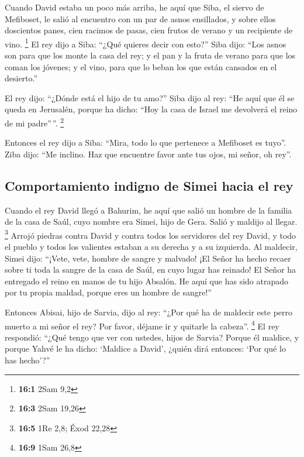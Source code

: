  Cuando David estaba un poco más arriba, he aquí que Siba,
el siervo de Mefiboset, le salió al encuentro con un par de asnos
ensillados, y sobre ellos doscientos panes, cien racimos de pasas, cien
frutos de verano y un recipiente de vino. \footnote{\textbf{16:1} 2Sam
  9,2}  El rey dijo a Siba: ``¿Qué quieres decir con
esto?'' Siba dijo: ``Los asnos son para que los monte la casa del rey; y
el pan y la fruta de verano para que los coman los jóvenes; y el vino,
para que lo beban los que están cansados en el desierto.''

 El rey dijo: ``¿Dónde está el hijo de tu amo?'' Siba dijo
al rey: ``He aquí que él se queda en Jerusalén, porque ha dicho: ``Hoy
la casa de Israel me devolverá el reino de mi padre''\,''. \footnote{\textbf{16:3}
  2Sam 19,26}

 Entonces el rey dijo a Siba: ``Mira, todo lo que
pertenece a Mefiboset es tuyo''. Ziba dijo: ``Me inclino. Haz que
encuentre favor ante tus ojos, mi señor, oh rey''.

\hypertarget{comportamiento-indigno-de-simei-hacia-el-rey}{%
\subsection{Comportamiento indigno de Simei hacia el
rey}\label{comportamiento-indigno-de-simei-hacia-el-rey}}

 Cuando el rey David llegó a Bahurim, he aquí que salió un
hombre de la familia de la casa de Saúl, cuyo nombre era Simei, hijo de
Gera. Salió y maldijo al llegar. \footnote{\textbf{16:5} 1Re 2,8; Éxod
  22,28}  Arrojó piedras contra David y contra todos los
servidores del rey David, y todo el pueblo y todos los valientes estaban
a su derecha y a su izquierda.  Al maldecir, Simei dijo:
``¡Vete, vete, hombre de sangre y malvado!  ¡El Señor ha
hecho recaer sobre ti toda la sangre de la casa de Saúl, en cuyo lugar
has reinado! El Señor ha entregado el reino en manos de tu hijo Absalón.
He aquí que has sido atrapado por tu propia maldad, porque eres un
hombre de sangre!''

 Entonces Abisai, hijo de Sarvia, dijo al rey: ``¿Por qué
ha de maldecir este perro muerto a mi señor el rey? Por favor, déjame ir
y quitarle la cabeza''. \footnote{\textbf{16:9} 1Sam 26,8}
 El rey respondió: ``¿Qué tengo que ver con ustedes,
hijos de Sarvia? Porque él maldice, y porque Yahvé le ha dicho: `Maldice
a David', ¿quién dirá entonces: `Por qué lo has hecho'?''

